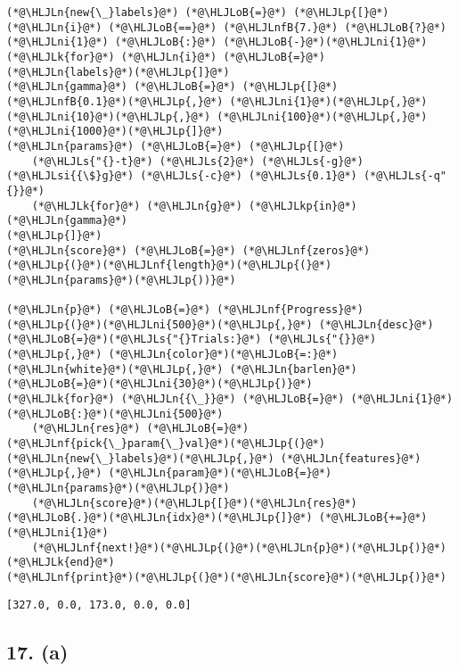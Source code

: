 \documentclass[12pt,a4paper]{article}
\newcommand{\HLJLk}[1]{\textcolor[RGB]{148,91,176}{\textbf{#1}}}
\newcommand{\HLJLkp}[1]{\textcolor[RGB]{148,91,176}{\textbf{#1}}}
\newcommand{\HLJLn}[1]{#1}
\newcommand{\HLJLnf}[1]{\textcolor[RGB]{66,102,213}{#1}}
\newcommand{\HLJLs}[1]{\textcolor[RGB]{201,61,57}{#1}}
\newcommand{\HLJLsi}[1]{#1}
\newcommand{\HLJLnfB}[1]{\textcolor[RGB]{59,151,46}{#1}}
\newcommand{\HLJLni}[1]{\textcolor[RGB]{59,151,46}{#1}}
\newcommand{\HLJLoB}[1]{\textcolor[RGB]{102,102,102}{\textbf{#1}}}
\newcommand{\HLJLp}[1]{#1}
\begin{document}
\begin{lstlisting}
(*@\HLJLn{new{\_}labels}@*) (*@\HLJLoB{=}@*) (*@\HLJLp{[}@*)(*@\HLJLn{i}@*) (*@\HLJLoB{==}@*) (*@\HLJLnfB{7.}@*) (*@\HLJLoB{?}@*) (*@\HLJLni{1}@*) (*@\HLJLoB{:}@*) (*@\HLJLoB{-}@*)(*@\HLJLni{1}@*) (*@\HLJLk{for}@*) (*@\HLJLn{i}@*) (*@\HLJLoB{=}@*) (*@\HLJLn{labels}@*)(*@\HLJLp{]}@*)
(*@\HLJLn{gamma}@*) (*@\HLJLoB{=}@*) (*@\HLJLp{[}@*)(*@\HLJLnfB{0.1}@*)(*@\HLJLp{,}@*) (*@\HLJLni{1}@*)(*@\HLJLp{,}@*) (*@\HLJLni{10}@*)(*@\HLJLp{,}@*) (*@\HLJLni{100}@*)(*@\HLJLp{,}@*) (*@\HLJLni{1000}@*)(*@\HLJLp{]}@*)
(*@\HLJLn{params}@*) (*@\HLJLoB{=}@*) (*@\HLJLp{[}@*)
    (*@\HLJLs{"{}-t}@*) (*@\HLJLs{2}@*) (*@\HLJLs{-g}@*) (*@\HLJLsi{{\$}g}@*) (*@\HLJLs{-c}@*) (*@\HLJLs{0.1}@*) (*@\HLJLs{-q"{}}@*)
    (*@\HLJLk{for}@*) (*@\HLJLn{g}@*) (*@\HLJLkp{in}@*) (*@\HLJLn{gamma}@*)
(*@\HLJLp{]}@*)
(*@\HLJLn{score}@*) (*@\HLJLoB{=}@*) (*@\HLJLnf{zeros}@*)(*@\HLJLp{(}@*)(*@\HLJLnf{length}@*)(*@\HLJLp{(}@*)(*@\HLJLn{params}@*)(*@\HLJLp{))}@*)

(*@\HLJLn{p}@*) (*@\HLJLoB{=}@*) (*@\HLJLnf{Progress}@*)(*@\HLJLp{(}@*)(*@\HLJLni{500}@*)(*@\HLJLp{,}@*) (*@\HLJLn{desc}@*)(*@\HLJLoB{=}@*)(*@\HLJLs{"{}Trials:}@*) (*@\HLJLs{"{}}@*)(*@\HLJLp{,}@*) (*@\HLJLn{color}@*)(*@\HLJLoB{=:}@*)(*@\HLJLn{white}@*)(*@\HLJLp{,}@*) (*@\HLJLn{barlen}@*)(*@\HLJLoB{=}@*)(*@\HLJLni{30}@*)(*@\HLJLp{)}@*)
(*@\HLJLk{for}@*) (*@\HLJLn{{\_}}@*) (*@\HLJLoB{=}@*) (*@\HLJLni{1}@*)(*@\HLJLoB{:}@*)(*@\HLJLni{500}@*)
    (*@\HLJLn{res}@*) (*@\HLJLoB{=}@*) (*@\HLJLnf{pick{\_}param{\_}val}@*)(*@\HLJLp{(}@*)(*@\HLJLn{new{\_}labels}@*)(*@\HLJLp{,}@*) (*@\HLJLn{features}@*)(*@\HLJLp{,}@*) (*@\HLJLn{param}@*)(*@\HLJLoB{=}@*)(*@\HLJLn{params}@*)(*@\HLJLp{)}@*)
    (*@\HLJLn{score}@*)(*@\HLJLp{[}@*)(*@\HLJLn{res}@*)(*@\HLJLoB{.}@*)(*@\HLJLn{idx}@*)(*@\HLJLp{]}@*) (*@\HLJLoB{+=}@*) (*@\HLJLni{1}@*)
    (*@\HLJLnf{next!}@*)(*@\HLJLp{(}@*)(*@\HLJLn{p}@*)(*@\HLJLp{)}@*)
(*@\HLJLk{end}@*)
(*@\HLJLnf{print}@*)(*@\HLJLp{(}@*)(*@\HLJLn{score}@*)(*@\HLJLp{)}@*)
\end{lstlisting}

\begin{lstlisting}
[327.0, 0.0, 173.0, 0.0, 0.0]
\end{lstlisting}


\subsection{17. (a)}
\end{document}
